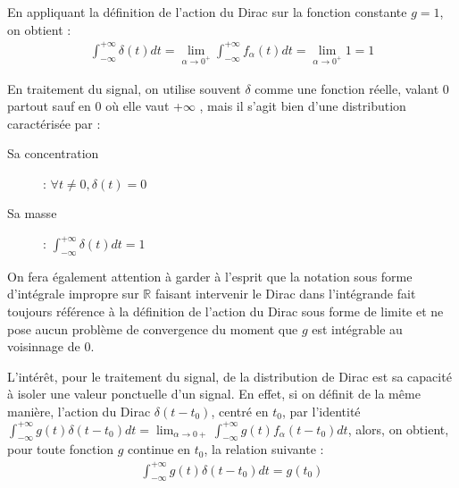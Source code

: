 En appliquant la définition de l'action du Dirac sur la fonction constante $g = 1$, on obtient :
\begin{align*}
    \int_{-\infty}^{+\infty} \delta(t) dt = \lim_{\alpha \to 0^+} \int_{-\infty}^{+\infty}f_\alpha(t)dt = \lim_{\alpha \to 0^+} 1 = 1
\end{align*}

En traitement du signal, on utilise souvent $\delta$ comme une fonction réelle, valant 0 partout sauf en 0 où elle vaut \og +$\infty$ \fg,  mais il s'agit bien d'une distribution caractérisée par :

\begin{description}
    \item[Sa concentration] : $\forall t \neq 0, \delta(t) = 0$
    \item[Sa masse] : $\int_{-\infty}^{+\infty}\delta(t)dt = 1$
\end{description}

On fera également attention à garder à l'esprit que la notation sous forme d'intégrale impropre sur $\mathbb{R}$ faisant intervenir le Dirac dans l'intégrande fait toujours référence à la définition de l'action du Dirac sous forme de limite et ne pose aucun problème de convergence du moment que $g$ est intégrable au voisinnage de 0.

L'intérêt, pour le traitement du signal, de la distribution de Dirac est sa capacité à isoler une valeur ponctuelle d'un signal. En effet, si on définit de la même manière, l'action du Dirac $\delta(t - t_0)$, centré en $t_0$, par l'identité $\int_{-\infty}^{+\infty} g(t) \delta(t-t_0) dt = \lim_{\alpha \to 0+} \int_{-\infty}^{+\infty} g(t) f_{\alpha}(t-t_0) dt$, alors, on obtient, pour toute fonction $g$ continue en $t_0$, la relation suivante :
\begin{align*}
    \int_{-\infty}^{+\infty} g(t) \delta(t-t_0) dt = g(t_0)
\end{align*}

